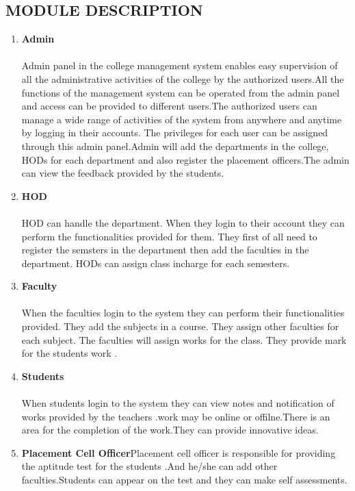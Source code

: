 \documentclass[a4paper, 12pt]{report}
\begin{document}
\subsection{MODULE DESCRIPTION}
\begin{enumerate}
\item \textbf{Admin}
\paragraph{}Admin panel in the college management system enables easy supervision of all the administrative activities of the college by the authorized users.All the functions of the management system can be operated from the admin panel and access can be provided to different users.The authorized users can manage a wide range of activities of the system from anywhere and anytime by logging in their accounts. The privileges for each user can be assigned through this admin panel.Admin will add the departments in the college, HODs for each department and also register the placement officers.The admin can view the feedback provided by the students. 
\item \textbf{HOD}\paragraph{}HOD can handle the department. When they login to their account they can perform the functionalities provided for them. They first of all need to register the semsters in the department then add the faculties in the department. HODs can assign class incharge for each semesters.
\item \textbf{Faculty}\paragraph{}When the faculties login to the system they can perform their functionalities provided. They add the subjects in a course. They assign other faculties for each subject. The faculties will assign works for the class. They provide mark for the students work .
\item \textbf{Students}\paragraph{} When students  login to the system they can view notes and notification of works provided by the teachers .work may be online or offilne.There is an area for the completion of the work.They can provide innovative ideas.
\item \textbf{Placement Cell Officer}Placement cell officer is responsible for providing the aptitude test for the students .And he/she can add other faculties.Students can  appear on  the test and they can make self assessments.
\end{enumerate}
\end{document}
